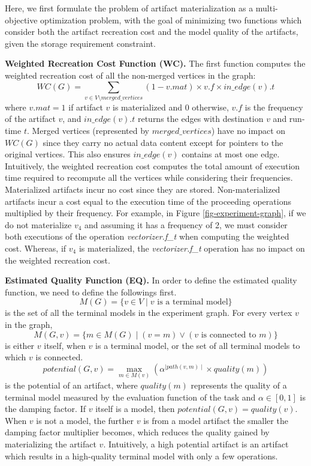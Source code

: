 Here, we first formulate the problem of artifact materialization as a multi-objective optimization problem, with the goal of minimizing two functions which consider both the artifact recreation cost and the model quality of the artifacts, given the storage requirement constraint.

\textbf{Weighted Recreation Cost Function (WC).} 
The first function computes the weighted recreation cost of all the non-merged vertices in the graph:
\[
WC(G) =  \sum\limits_{v \in V\setminus merged\_vertices}  (1-v.mat) \times v.f \times in\_edge(v).t
\]
where $v.mat = 1$ if artifact $v$ is materialized and $0$ otherwise, $v.f$ is the frequency of the artifact $v$, and $in\_edge(v).t$ returns the edges with destination $v$ and run-time $t$.
Merged vertices (represented by $merged\_vertices$) have no impact on $WC(G)$ since they carry no actual data content except for pointers to the original vertices.
This also ensures $in\_edge(v)$ contains at most one edge.
Intuitively, the weighted recreation cost computes the total amount of execution time required to recompute all the vertices while considering their frequencies.
Materialized artifacts incur no cost since they are stored.
Non-materialized artifacts incur a cost equal to the execution time of the proceeding operations multiplied by their frequency.
For example, in Figure \ref{fig-experiment-graph}, if we do not materialize $v_4$ and assuming it has a frequency of 2, we must consider both executions of the operation \textit{vectorizer.f\_t}  when computing the weighted cost.
Whereas, if $v_4$ is materialized, the \textit{vectorizer.f\_t} operation has no impact on the weighted recreation cost.

\textbf{Estimated Quality Function (EQ).} 
In order to define the estimated quality function, we need to define the followings first.
\[
M(G) = \{v \in V \mid v \text{ is a terminal model}\}
\]
is the set of all the terminal models in the experiment graph.
For every vertex $v$ in the graph, 
\[
M(G, v) = \{m \in M(G) \mid (v = m) \vee (v \text{ is connected to } m)\}
\]
is either $v$ itself, when $v$ is a terminal model, or the set of all terminal models to which $v$ is connected.
\[
potential(G, v) = \max\limits_{m \in M(v)} ( \alpha ^ {\mid path(v,m) \mid} \times quality(m) )
\]
is the potential of an artifact, where $quality(m)$ represents the quality of a terminal model measured by the evaluation function of the task and $\alpha \in [0,1]$ is the damping factor.
If $v$ itself is a model, then $potential(G, v) = quality(v)$.
When $v$ is not a model, the further $v$ is from a model artifact the smaller the damping factor multiplier becomes, which reduces the quality gained by materializing the artifact $v$.
Intuitively, a high potential artifact is an artifact which results in a high-quality terminal model with only a few operations.

